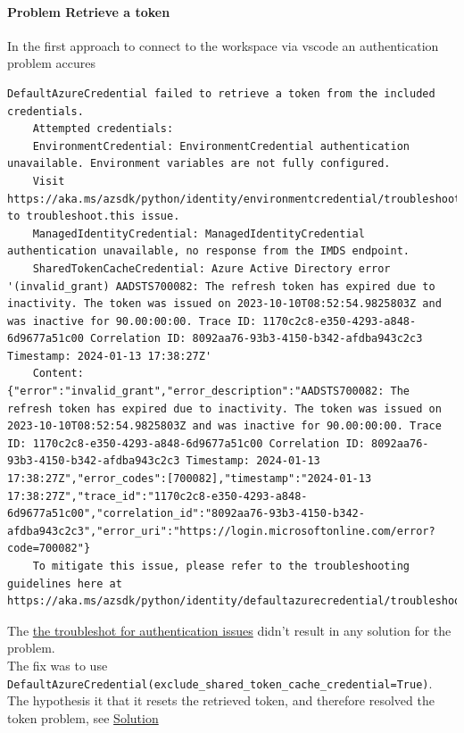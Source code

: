 \paragraph{Problem Retrieve a token}
In the first approach to connect to the workspace via vscode an authentication problem accures
\begin{lstlisting}[style=CMD]
	DefaultAzureCredential failed to retrieve a token from the included credentials.
	Attempted credentials:
	EnvironmentCredential: EnvironmentCredential authentication unavailable. Environment variables are not fully configured.
	Visit https://aka.ms/azsdk/python/identity/environmentcredential/troubleshoot to troubleshoot.this issue.
	ManagedIdentityCredential: ManagedIdentityCredential authentication unavailable, no response from the IMDS endpoint.
	SharedTokenCacheCredential: Azure Active Directory error '(invalid_grant) AADSTS700082: The refresh token has expired due to inactivity. The token was issued on 2023-10-10T08:52:54.9825803Z and was inactive for 90.00:00:00. Trace ID: 1170c2c8-e350-4293-a848-6d9677a51c00 Correlation ID: 8092aa76-93b3-4150-b342-afdba943c2c3 Timestamp: 2024-01-13 17:38:27Z'
	Content: {"error":"invalid_grant","error_description":"AADSTS700082: The refresh token has expired due to inactivity. The token was issued on 2023-10-10T08:52:54.9825803Z and was inactive for 90.00:00:00. Trace ID: 1170c2c8-e350-4293-a848-6d9677a51c00 Correlation ID: 8092aa76-93b3-4150-b342-afdba943c2c3 Timestamp: 2024-01-13 17:38:27Z","error_codes":[700082],"timestamp":"2024-01-13 17:38:27Z","trace_id":"1170c2c8-e350-4293-a848-6d9677a51c00","correlation_id":"8092aa76-93b3-4150-b342-afdba943c2c3","error_uri":"https://login.microsoftonline.com/error?code=700082"}
	To mitigate this issue, please refer to the troubleshooting guidelines here at https://aka.ms/azsdk/python/identity/defaultazurecredential/troubleshoot.
\end{lstlisting}

The \href{https://github.com/Azure/azure-sdk-for-python/blob/main/sdk/identity/azure-identity/TROUBLESHOOTING.md#troubleshoot-environmentcredential-authentication-issues}{the troubleshot for authentication issues} didn't result in any solution for the problem.\\

The fix was to use \verb+DefaultAzureCredential(exclude_shared_token_cache_credential=True)+. The hypothesis it that it resets the retrieved token, and therefore resolved the token problem, see \href{https://github.com/Azure/azure-sdk-for-python/issues/29040}{Solution}


